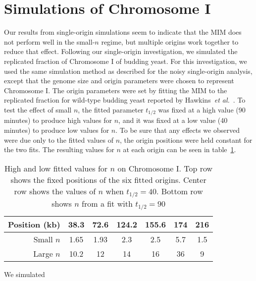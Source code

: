 		
	\section{Simulations of Chromosome I}
	\label{sec:ChromosomeI}
	
	Our results from single-origin simulations seem to indicate that the MIM does not perform well in the small-$n$ regime, but multiple origins work together to reduce that effect.
	Following our single-origin investigation, we simulated the replicated fraction of Chromosome I of budding yeast.
	For this investigation, we used the same simulation method as described for the noisy single-origin analysis, except that the genome size and origin parameters were chosen to represent Chromosome I.
	The origin parameters were set by fitting the MIM to the replicated fraction for wild-type budding yeast reported by Hawkins~\emph{et al.}~\cite{StochasticTermination}.
	To test the effect of small $n$, the fitted parameter $t_{1/2}$ was fixed at a high value (90 minutes) to produce high values for $n$, and it was fixed at a low value (40 minutes) to produce low values for $n$.
	To be sure that any effects we observed were due only to the fitted values of $n$, the origin positions were held constant for the two fits.
	The resulting values for $n$ at each origin can be seen in table~\ref{tab:LargeAndSmallN}.
	
	\begin{table}
		\begin{center}
			\begin{tabular}{| r | c | c | c | c | c | c |}	
				\hline
				Position (kb)	&	38.3	&	72.6	&	124.2	&	155.6	&	174	&	216	\\	\hline
				Small $n$	&	1.65	&	1.93	&	2.3	&	2.5	&	5.7	&	1.5	\\
				Large $n$	&	10.2	&	12	&	14	&	16	&	36	&	9	\\	\hline
			\end{tabular}
		\end{center}
		
		\caption[High and low $n$ fit values for Chromosome I]{\label{tab:LargeAndSmallN}
			High and low fitted values for $n$ on Chromosome I.
			Top row shows the fixed positions of the six fitted origins.
			Center row shows the values of $n$ when $t_{1/2}=40$.
			Bottom row shows $n$ from a fit with $t_{1/2}=90$
		}
	\end{table}
	
	We simulated
	







































